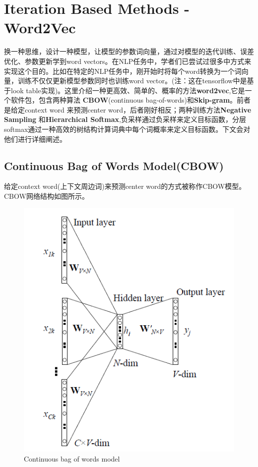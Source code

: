 \documentclass[twoside,nofonts,fancyhdr,openany,UTF8]{ctexbook}
\begin{document}
\section{Iteration Based Methods - Word2Vec}
换一种思维，设计一种模型，让模型的参数词向量，通过对模型的迭代训练、误差优化、参数更新学到word vectors。在NLP任务中，学者们已尝试过很多中方式来实现这个目的。比如在特定的NLP任务中，刚开始时将每个word转换为一个词向量，训练不仅仅更新模型参数同时也训练word vector。(注：这在tensorflow中是基于look table实现)。这里介绍一种更高效、简单的、概率的方法\textbf{word2vec},它是一个软件包，包含两种算法 \textbf{CBOW}(continuous bag-of-words)和\textbf{Skip-gram}。前者是给定context word 来预测center word，后者刚好相反；两种训练方法\textbf{Negative Sampling} 和\textbf{Hierarchical Softmax},负采样通过负采样来定义目标函数，分层softmax通过一种高效的树结构计算词典中每个词概率来定义目标函数。下文会对他们进行详细阐述。

\subsection{Continuous Bag of Words Model(CBOW)}
给定context word(上下文周边词)来预测center word的方式被称作CBOW模型。CBOW网络结构如图所示。
\begin{figure}[!htb]
\centering
\includegraphics[scale=0.8]{cbow}
\caption{Continuous bag of words model}
\end{figure}
\end{document}
